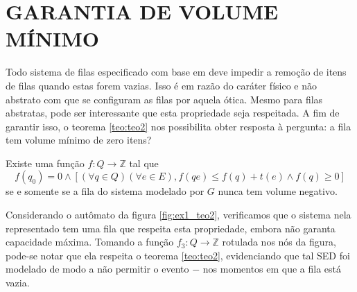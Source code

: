 \section{GARANTIA DE VOLUME MÍNIMO}
\label{sec:vol_min}

Todo sistema de filas especificado com base em  deve impedir a remoção de itens de filas quando estas forem vazias. Isso é em razão do caráter físico e não abstrato com que se configuram as filas por aquela ótica. Mesmo para filas abstratas, pode ser interessante que esta propriedade seja respeitada. A fim de garantir isso, o teorema \ref{teo:teo2} nos possibilita obter resposta à pergunta: a fila tem volume mínimo de zero itens?

\begin{teo}
	\label{teo:teo2}
	Existe uma função $f : Q \to \mathbb{Z}$ tal que \begin{equation*}
	f(q_0) = 0 \wedge [(\forall q \in Q)(\forall e \in E), f(qe) \leq f(q) + t(e) \wedge f(q) \geq 0]
	\end{equation*} se e somente se a fila do sistema modelado por $G$ nunca tem volume negativo.
\end{teo}

Considerando o autômato da figura \ref{fig:ex1_teo2}, verificamos que o sistema nela representado tem uma fila que respeita esta propriedade, embora não garanta capacidade máxima. Tomando a função $f_3 : Q \to \mathbb{Z}$ rotulada nos nós da figura, pode-se notar que ela respeita o teorema \ref{teo:teo2}, evidenciando que tal SED foi modelado de modo a não permitir o evento $-$ nos momentos em que a fila está vazia.



